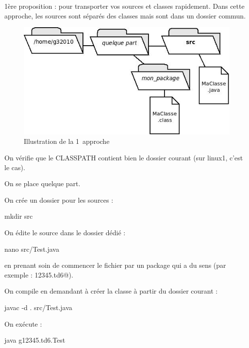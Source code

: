\documentclass[a4paper,11pt]{article}
\begin{document}
			
			\begin{Tutoriel}{1\`ere proposition : pour transporter vos sources et classes rapidement.} 
				Dans cette approche, les sources sont s\'epar\'es des classes mais sont dans un dossier commun.
			
            		\par
       			 	\begin{figure}[hbt]
				    	\begin{center}
						\includegraphics[width=0.6\linewidth,height=0.8\textheight,keepaspectratio=true]{image/approche4.jpeg}
					\end{center}
                
                   			 \caption[Illustration de la 1\iere\ approche]
                   			 {Illustration de la 1\iere\ approche}
               			 \end{figure}
                    
				\begin{steps}
				
					\item On v\'erifie que le CLASSPATH contient bien le 
						dossier courant (sur linux1, c'est le cas).
				
					\item On se place quelque part.
				
					\item On cr\'ee un dossier pour les sources : 
						\begin{Console}
							mkdir src
						\end{Console}
					\item On \'edite le source dans le dossier d\'edi\'e : 
						\begin{Console}
							nano src/Test.java
						\end{Console}
				
						en prenant soin de commencer le fichier par un package qui a du sens
						(par exemple : \verb@g12345.td6@).
				
					\item On compile en demandant \`a cr\'eer la classe \`a partir
						du dossier courant : 
						\begin{Console}
							javac -d . src/Test.java
						\end{Console}
					\item On ex\'ecute : 
						\begin{Console}
							java g12345.td6.Test
						\end{Console}
				\end{steps}
				
			\end{Tutoriel}	
\end{document}
